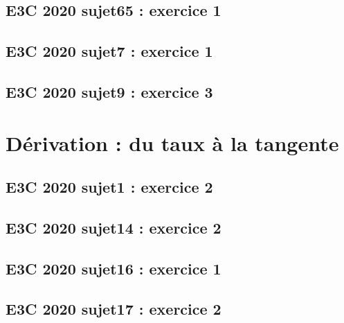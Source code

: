 \documentclass[lang=fr,edition=teacher,layout=sheet]{mxbook}
\begin{document}
\par\bigskip
{}\subsection*{E3C 2020 sujet65 : exercice 1}
\begingroup\endgroup
\par\bigskip
{}\subsection*{E3C 2020 sujet7 : exercice 1}
\begingroup\endgroup
\par\bigskip
{}\subsection*{E3C 2020 sujet9 : exercice 3}
\begingroup\endgroup
\par\bigskip
\clearpage\section*{Dérivation : du taux à la tangente}
\subsection*{E3C 2020 sujet1 : exercice 2}
\begingroup\endgroup
\par\bigskip
{}\subsection*{E3C 2020 sujet14 : exercice 2}
\begingroup\endgroup
\par\bigskip
{}\subsection*{E3C 2020 sujet16 : exercice 1}
\begingroup\endgroup
\par\bigskip
{}\subsection*{E3C 2020 sujet17 : exercice 2}
\end{document}

